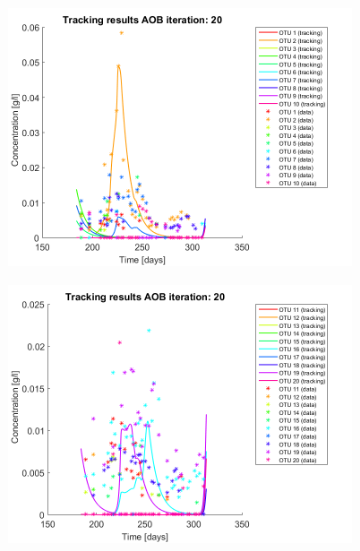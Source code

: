\documentclass[3p,times]{article}
\begin{document}
\begin{figure}[h]
	\centering
	\begin{subfigure}{0.45 \textwidth}
		\includegraphics[width =\textwidth]{Application//200407_iter_20_AOB_plot_1}
	\end{subfigure}
	\begin{subfigure}{0.45 \textwidth}
	\includegraphics[width =\textwidth]{Application//200407_iter_20_AOB_plot_2}
	\end{subfigure}
	\begin{subfigure}{0.45 \textwidth}

\end{subfigure}
\end{figure}
\end{document}
